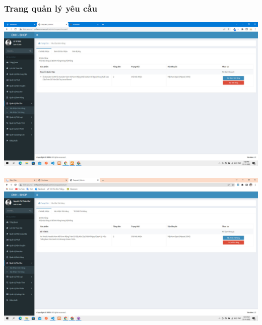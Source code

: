 \documentclass[12pt,a4paper,2sides]{report}
\begin{document}
\subsubsection{Trang quản lý yêu cầu}
    \includegraphics[width=1\linewidth]{lib/results/xacnhandonhang.jpg}\\\vspace*{1cm}  
    \hspace{4cm}{Hình 55. Danh sách các đơn hàng chờ duyệt}\\
    \includegraphics[width=1\linewidth]{lib/results/xacnhantrahang.jpg}\\\vspace*{1cm}  
    \hspace{3cm}{Hình 56. Danh sách các đơn hàng chờ duyệt trả hàng}\\
\end{document}
